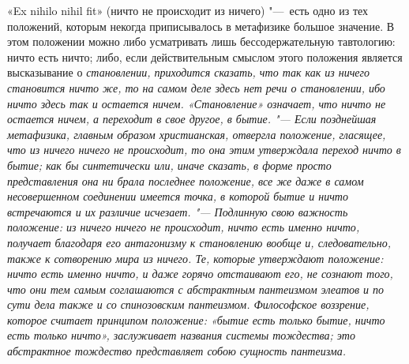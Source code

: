 «Ex nihilo nihil fit» (ничто не происходит из ничего) "---~есть одно из тех
положений, которым некогда приписывалось в метафизике большое значение. В
этом положении можно либо усматривать лишь бессодержательную тавтологию:
ничто есть ничто; либо, если действительным смыслом этого положения
является высказывание о \em{становлении}, приходится
сказать, что так как из \em{ничего становится}
\em{ничто же}, то на самом деле здесь нет речи о
становлении, ибо ничто здесь так и остается ничем. «Становление» означает,
что ничто не остается ничем, а переходит в свое другое, в бытие. "--- Если
позднейшая метафизика, главным образом христианская, отвергла положение,
гласящее, что из ничего ничего не происходит, то она этим утверждала
переход ничто в бытие; как бы синтетически или, иначе сказать, в форме
просто представления она ни брала последнее положение, все же даже в самом
несовершенном соединении имеется точка, в которой бытие и ничто встречаются
и их различие исчезает. "--- Подлинную свою важность положение:
\em{из ничего ничего не происходит},
\em{ничто есть именно ничто}, получает благодаря его
антагонизму к \em{становлению} вообще и,
следовательно, также к сотворению мира из ничего. Те, которые утверждают
положение: ничто есть именно ничто, и даже горячо отстаивают его, не
сознают того, что они тем самым соглашаются с абстрактным
\em{пантеизмом} элеатов и по сути дела также и со
спинозовским пантеизмом. Философское воззрение, которое считает принципом
положение: «бытие есть только бытие, ничто есть только ничто», заслуживает
названия системы тождества; это абстрактное тождество представляет собою
сущность пантеизма.

